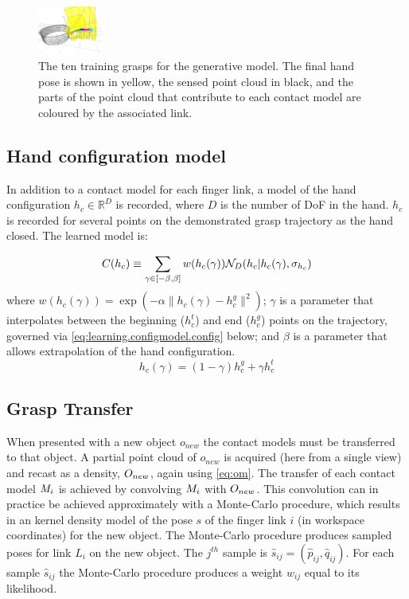 \begin{figure}[t]
\includegraphics[width=0.19\textwidth]{images/contact-viewall10}
\caption{The ten training grasps for the generative model. The final hand pose is shown in yellow, the sensed point cloud in black, and the parts of the point cloud that contribute to each contact model are coloured by the associated link. \label{fig:generative-training}}
\end{figure}
\subsection{Hand configuration model}
In addition to a contact model for each finger link, a model of the hand configuration $h_c \in \mathbb R^D$ is recorded, where $D$ is the number of DoF in the hand. $h_c$  is recorded for several points on the demonstrated grasp trajectory as the hand closed. The learned model is:

\begin{equation}
\hc(h_c) \equiv \sum_{\gamma \in [-\beta, \beta]} w({h_c(\gamma)}) \mathcal{N}_D(h_c|h_c(\gamma), \sigma_{h_c}) 
\label{eq:hc}
\end{equation}
where $w({h_c(\gamma)}) = \exp(-\alpha \|h_c(\gamma) - h^g_c \|^2)$; $\gamma$ is a parameter that interpolates between the beginning ($h^t_c$) and end ($h^g_c$) points on the trajectory, governed via \eq\ref{eq:learning.configmodel.config} below; and $\beta$ is a parameter that allows extrapolation of the hand configuration.
\begin{equation}
h_c(\gamma) = (1 - \gamma)h^g_c + \gamma h^t_c
\label{eq:learning.configmodel.config}
\end{equation}

\subsection{Grasp Transfer}
When presented with a new object $o_{new}$ the contact models must be transferred to that object.  A partial point cloud of $o_{new}$ is acquired (here from a single view) and recast as a density, $O_{new}$, again using \eq \ref{eq:om}. The transfer of each contact model $M_i$ is achieved by convolving $M_i$ with $O_{new}$. This convolution can in practice be achieved approximately with a Monte-Carlo procedure, which results in an kernel density model of the pose $s$ of the finger link $i$ (in workspace coordinates) for the new object. The Monte-Carlo procedure produces sampled poses for link $L_i$ on the new object. The $j^{th}$ sample is $\hat{s}_{ij}=(\hat{p}_{ij},\hat{q}_{ij})$. For each sample $\hat{s}_{ij}$ the Monte-Carlo procedure produces a weight $w_{ij}$ equal to its likelihood.

